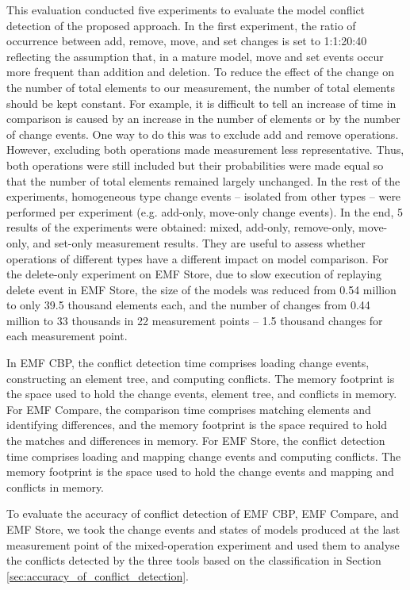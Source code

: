 This evaluation conducted five experiments to evaluate the model conflict detection of the proposed approach. In the first experiment, the ratio of occurrence between \textsf{add}, \textsf{remove}, \textsf{move}, and \textsf{set} changes is set to 1:1:20:40 reflecting the assumption that, in a mature model, \textsf{move} and \textsf{set} events occur more frequent than addition and deletion. To reduce the effect of the change on the number of total elements to our measurement, the number of total elements should be kept constant. For example, it is difficult to tell an increase of time in comparison is caused by an increase in the number of elements or by the number of change events. One way to do this was to exclude \textsf{add} and \textsf{remove} operations. However, excluding both operations made measurement less representative. Thus, both operations were still included but their probabilities were made equal so that the number of total elements remained largely unchanged. In the rest of the experiments,
homogeneous type change events -- isolated from other types -- were performed per experiment (e.g. add-only, move-only change events). In the end, 5 results of the experiments were obtained: mixed, add-only, remove-only, move-only, and set-only measurement results. They are useful to assess whether operations of different types have a different impact on model comparison. For the delete-only experiment on EMF Store, due to slow execution of replaying \textsf{delete} event in EMF Store, the size of the models was reduced from 0.54 million to only 39.5 thousand elements each, and the number of changes from 0.44 million to 33 thousands in 22 measurement points -- 1.5 thousand changes for each measurement point.

In EMF CBP, the conflict detection time comprises loading change events, constructing an element tree, and computing conflicts. The memory footprint is the space used to hold the change events, element tree, and conflicts in memory. For EMF Compare, the comparison time comprises matching elements and identifying differences, and the memory footprint is the space required to hold the matches and differences in memory. For EMF Store, the conflict detection time comprises loading and mapping change events and computing conflicts. The memory footprint is the space used to hold the change events and mapping and conflicts in memory.

To evaluate the accuracy of conflict detection of EMF CBP, EMF Compare, and EMF Store, we took the change events and states of models produced at the last measurement point of the mixed-operation experiment and used them to analyse the conflicts detected by the three tools based on the classification in Section \ref{sec:accuracy_of_conflict_detection}.

